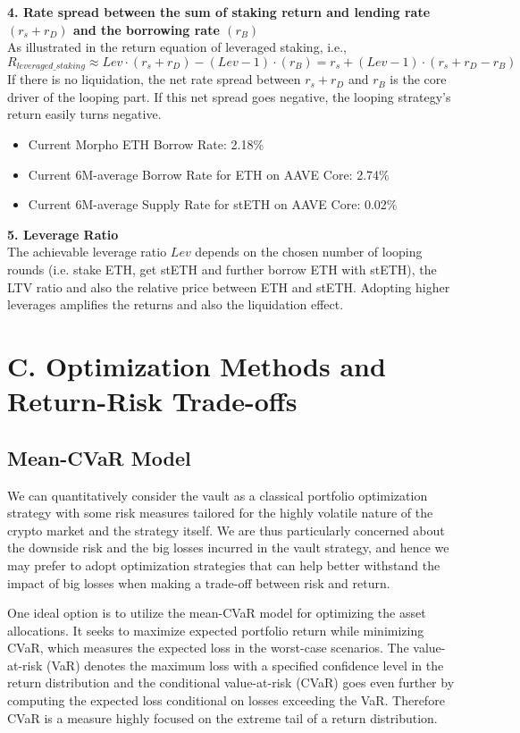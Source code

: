\documentclass[11pt, a4paper]{article}
\begin{document}
\textbf{4. Rate spread between the sum of staking return and lending rate $(r_s + r_D)$ and the borrowing rate $(r_B)$} \\
As illustrated in the return equation of leveraged staking, i.e.,
\begin{equation*}
    R_{leveraged\_staking} \approx Lev \cdot (r_s + r_D) - (Lev - 1) \cdot (r_B) = r_s + (Lev - 1) \cdot (r_s + r_D - r_B)
\end{equation*}
If there is no liquidation, the net rate spread between $r_s + r_D$ and $r_B$ is the core driver of the looping part. If this net spread goes negative, the looping strategy's return easily turns negative. 
\begin{itemize}
    \item Current Morpho ETH Borrow Rate: 2.18\%
    \item Current 6M-average Borrow Rate for ETH on AAVE Core: 2.74\%
    \item Current 6M-average Supply Rate for stETH on AAVE Core: 0.02\%
\end{itemize}

\textbf{5. Leverage Ratio} \\
The achievable leverage ratio $Lev$ depends on the chosen number of looping rounds (i.e. stake ETH, get stETH and further borrow ETH with stETH), the LTV ratio and also the relative price between ETH and stETH. Adopting higher leverages amplifies the returns and also the liquidation effect.

\section*{C. Optimization Methods and Return-Risk Trade-offs}

\subsection*{Mean-CVaR Model}
We can quantitatively consider the vault as a classical portfolio optimization strategy with some risk measures tailored for the highly volatile nature of the crypto market and the strategy itself. We are thus particularly concerned about the downside risk and the big losses incurred in the vault strategy, and hence we may prefer to adopt optimization strategies that can help better withstand the impact of big losses when making a trade-off between risk and return.

One ideal option is to utilize the mean-CVaR model for optimizing the asset allocations. It seeks to maximize expected portfolio return while minimizing CVaR, which measures the expected loss in the worst-case scenarios. The value-at-risk (VaR) denotes the maximum loss with a specified confidence level in the return distribution and the conditional value-at-risk (CVaR) goes even further by computing the expected loss conditional on losses exceeding the VaR. Therefore CVaR is a measure highly focused on the extreme tail of a return distribution.
\end{document}
